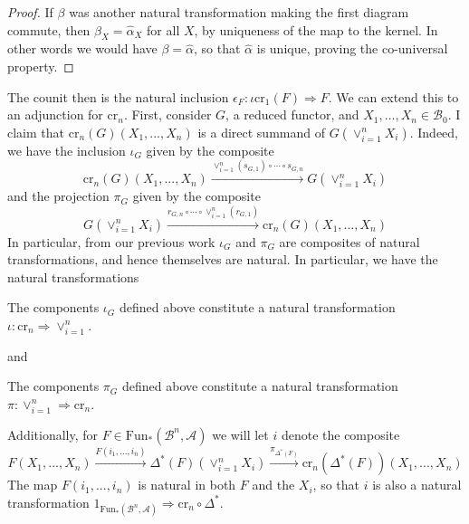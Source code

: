 \begin{proof}
    If $\beta$ was another natural transformation making the first diagram commute, then $\beta_X = \hat{\alpha}_X$ for all $X$, by uniqueness of the map to the kernel. In other words we would have $\beta = \hat{\alpha}$, so that $\hat{\alpha}$ is unique, proving the co-universal property.
\end{proof}


The counit then is the natural inclusion $\epsilon_F:\iota\text{cr}_1(F)\Rightarrow F$.  We can extend this to an adjunction for $\text{cr}_n$. First, consider $G$, a reduced functor, and $X_1,...,X_n \in \mathcal{B}_0$. I claim that $\text{cr}_n(G)(X_1,...,X_n)$ is a direct summand of $G(\lor_{i=1}^nX_i)$. Indeed, we have the inclusion $\iota_G$ given by the composite
\begin{equation*}
    \text{cr}_n(G)(X_1,...,X_n)\xrightarrow{\lor_{i=1}^n(s_{G,1})\circ \cdots \circ s_{G,n}}G(\lor_{i=1}^nX_i)
\end{equation*}
and the projection $\pi_G$ given by the composite
\begin{equation*}
    G(\lor_{i=1}^nX_i)\xrightarrow{r_{G,n}\circ \cdots \circ \lor_{i=1}^n(r_{G,1})}\text{cr}_n(G)(X_1,...,X_n)
\end{equation*}
In particular, from our previous work $\iota_G$ and $\pi_G$ are composites of natural transformations, and hence themselves are natural. In particular, we have the natural transformations
\begin{lem}[label=lem:lorInj]
    The components $\iota_G$ defined above constitute a natural transformation $\iota:\text{cr}_n\Rightarrow \lor_{i=1}^n$.
\end{lem}
\noindent and 
\begin{lem}[label=lem:lorProj]
    The components $\pi_G$ defined above constitute a natural transformation $\pi:\lor_{i=1}^n\Rightarrow \text{cr}_n$.
\end{lem}
Additionally, for $F \in {\text{Fun}_*(\mathcal{B}^n,\mathcal{A})}$ we will let $i$ denote the composite 
\begin{equation*}
    F(X_1,...,X_n)\xrightarrow{F(i_1,...,i_n)}\Delta^*(F)(\lor_{i=1}^nX_i)\xrightarrow{\pi_{\Delta^*(F)}}\text{cr}_n(\Delta^*(F))(X_1,...,X_n)
\end{equation*}
The map $F(i_1,...,i_n)$ is natural in both $F$ and the $X_i$, so that $i$ is also a natural transformation $1_{\text{Fun}_*(\mathcal{B}^n,\mathcal{A})}\Rightarrow \text{cr}_n\circ \Delta^*$.
